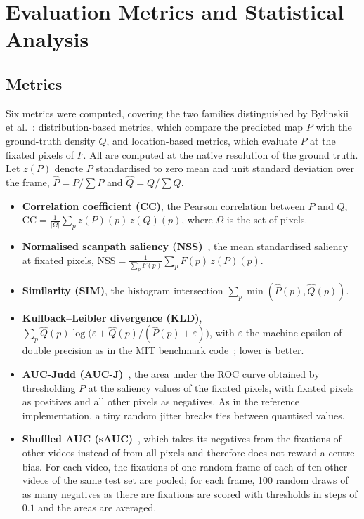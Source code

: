 \section{Evaluation Metrics and Statistical Analysis}\label{sec:evaluation-metrics}

\subsection{Metrics}

Six metrics were computed, covering the two families distinguished by
Bylinskii et al.~\cite{bylinskii2019metrics}: distribution-based metrics,
which compare the predicted map $P$ with the ground-truth density $Q$, and
location-based metrics, which evaluate $P$ at the fixated pixels of $F$. All
are computed at the native resolution of the ground truth. Let $z(P)$ denote
$P$ standardised to zero mean and unit standard deviation over the frame,
$\hat P=P/\sum P$ and $\hat Q=Q/\sum Q$.

\begin{itemize}
  \item \textbf{Correlation coefficient (\acrshort{CC})}, the Pearson correlation
    between $P$ and $Q$, $\mathrm{CC}=\frac{1}{|\Omega|}\sum_{p}z(P)(p)\,z(Q)(p)$, where
    $\Omega$ is the set of pixels.
  \item \textbf{Normalised scanpath saliency (\acrshort{NSS})}~\cite{peters2005components},
    the mean standardised saliency at fixated pixels,
    $\mathrm{NSS}=\frac{1}{\sum_p F(p)}\sum_p F(p)\,z(P)(p)$.
  \item \textbf{Similarity (\acrshort{SIM})}, the histogram intersection
    $\sum_p\min(\hat P(p),\hat Q(p))$.
  \item \textbf{Kullback--Leibler divergence (\acrshort{KLD})},
    $\sum_p\hat Q(p)\log\big(\varepsilon+\hat Q(p)/(\hat P(p)+\varepsilon)\big)$, with
    $\varepsilon$ the machine epsilon of double precision as in the MIT
    benchmark code~\cite{bylinskii2019metrics}; lower is better.
  \item \textbf{\acrshort{AUC}-Judd (\acrshort{AUC-J})}~\cite{judd2009learning}, the area under the
    \acrshort{ROC} curve obtained by thresholding $P$ at the saliency values of the
    fixated pixels, with fixated pixels as positives and all other pixels as
    negatives. As in the reference implementation, a tiny random jitter breaks
    ties between quantised values.
  \item \textbf{Shuffled \acrshort{AUC} (\acrshort{sAUC})}~\cite{zhang2008sun,borji2013quantitative},
    which takes its negatives from the fixations of other videos instead of
    from all pixels and therefore does not reward a centre bias. For each
    video, the fixations of one random frame of each of ten other videos of
    the same test set are pooled; for each frame, 100 random draws of as many
    negatives as there are fixations are scored with thresholds in steps of
    $0.1$ and the areas are averaged.
\end{itemize}

